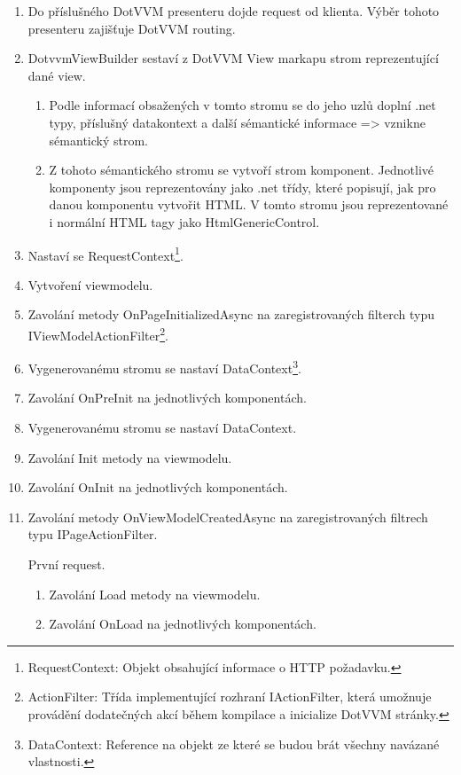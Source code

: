 \begin{enumerate}
    \item Do příslušného DotVVM presenteru dojde request od klienta. Výběr tohoto presenteru zajišťuje DotVVM routing.
    \item DotvvmViewBuilder sestaví z DotVVM View markapu strom reprezentující dané view. 
    \begin{enumerate}[label*=\arabic*.]
        \item Podle informací obsažených v tomto stromu se do jeho uzlů doplní .net typy, příslušný datakontext a další sémantické informace => vznikne sémantický strom.
        \item Z tohoto sémantického stromu se vytvoří strom komponent. Jednotlivé komponenty jsou reprezentovány jako .net třídy, které popisují, jak pro danou komponentu vytvořit HTML. V tomto stromu jsou reprezentované i normální HTML tagy jako HtmlGenericControl.
    \end{enumerate}
    \item Nastaví se RequestContext\footnote{RequestContext: Objekt obsahující informace o HTTP požadavku.}.
    \item Vytvoření viewmodelu.
    \item Zavolání metody OnPageInitializedAsync na zaregistrovaných filterch typu IViewModelActionFilter\footnote{\label{ActionFilterNote}ActionFilter: Třída implementující rozhraní IActionFilter, která umožnuje provádění dodatečných akcí během kompilace a inicialize DotVVM stránky. }.
    \item Vygenerovanému stromu se nastaví DataContext\footnote{\label{DataContext}DataContext: Reference na objekt ze které se budou brát všechny navázané vlastnosti.}.
    \item Zavolání OnPreInit na jednotlivých komponentách.
    \item Vygenerovanému stromu se nastaví DataContext.
    \item Zavolání Init metody na viewmodelu.
    \item Zavolání OnInit na jednotlivých komponentách.
    \item Zavolání metody OnViewModelCreatedAsync na zaregistrovaných filtrech typu IPageActionFilter.
    \begin{multicols}{2}
        První request.
        \begin{enumerate}[label*=\arabic*.]
            \item Zavolání Load metody na viewmodelu.
            \item Zavolání OnLoad na jednotlivých komponentách.

\end{enumerate}
\end{multicols}
\end{enumerate}
